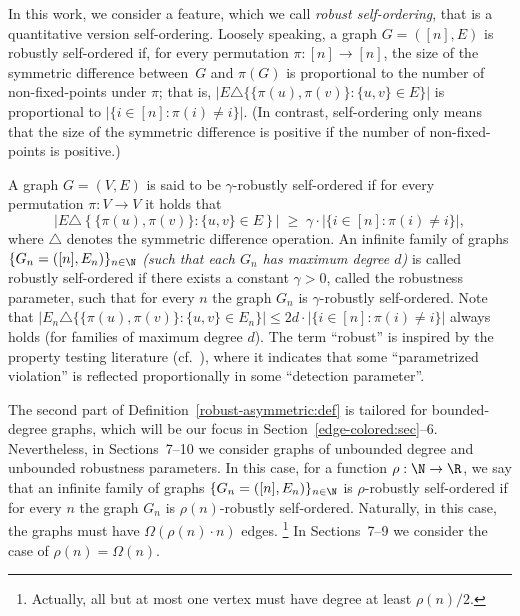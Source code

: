 In this work, we consider a feature,
which we call {\em robust self-ordering},
that is a quantitative version self-ordering.
%
Loosely speaking, a graph $G=([n],E)$ is robustly self-ordered if,
%
%
for every permutation $\pi:[n]\to[n]$,
the size of the symmetric difference between~$G$ and $\pi(G)$
is proportional to the number of non-fixed-points under $\pi$;
that is, $|E\triangle\{\{\pi(u),\pi(v)\}\!:\!\{u,v\}\!\in\!E\}|$
is proportional to $|\{i\!\in\![n]\!:\!\pi(i)\!\neq\!i\}|$.
(In contrast, self-ordering only means that
the size of the symmetric difference is positive
if the number of non-fixed-points is positive.)

%
\label{robust-asymmetric:def}
A graph $G=(V,E)$ is said to be {\sf $\gamma$-robustly self-ordered}
if for every permutation $\pi:V\to{V}$
it holds that
\begin{equation}\label{robust-asymmetric:eqdef}
\big|E\triangle\left\{\{\pi(u),\pi(v)\}\!:\!\{u,v\}\!\in\!E\right\}\big|
  \;\geq\; \gamma\cdot|\{i\in[n]\!:\!\pi(i)\neq i\}|,
\end{equation}
where $\triangle$ denotes the symmetric difference operation.
An infinite family of graphs $\{G_n=([n],E_n)\}_{n\in\N}$
{\em(such that each $G_n$ has maximum degree $d$)}
is called {\sf robustly self-ordered}
if there exists a constant $\gamma>0$, called the {\sf robustness parameter},
such that for every $n$ the graph $G_n$ is $\gamma$-robustly self-ordered.
\ED
Note that
$|E_n\triangle\{\{\pi(u),\pi(v)\}\!:\!\{u,v\}\!\in\!E_n\}|
 \leq 2d\cdot|\{i\in[n]\!:\!\pi(i)\neq i\}|$
always holds (for families of maximum degree $d$).
%
%
%
%
%
The term ``robust'' is inspired by
the property testing literature (cf.~\cite{RS}),
where it indicates that some ``parametrized violation''
is reflected proportionally in some ``detection parameter''.

The second part of Definition~\ref{robust-asymmetric:def}
is tailored for bounded-degree graphs, which will be our focus
in Section~\ref{edge-colored:sec}--6.
Nevertheless,
in Sections~7--10
we consider graphs
of unbounded degree and unbounded robustness parameters.
In this case, for a function $\rho:\N\to\R$,
we say that an infinite family of graphs $\{G_n=([n],E_n)\}_{n\in\N}$
is {\sf $\rho$-robustly self-ordered} if for every $n$
the graph $G_n$ is $\rho(n)$-robustly self-ordered.
Naturally, in this case, the graphs
must have $\Omega(\rho(n)\cdot n)$ edges.
\footnote{Actually, all but at most one vertex
must have degree at least $\rho(n)/2$.}
%
In Sections~7--9
we consider the case of $\rho(n)=\Omega(n)$.
















